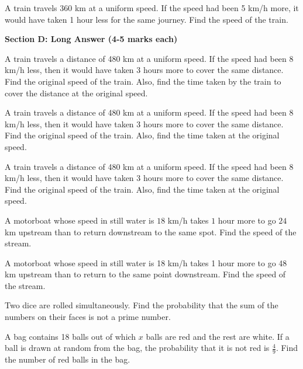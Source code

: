 \documentclass[12pt,a4paper]{exam}
\begin{document}
\begin{questions}
\question[3] A train travels 360 km at a uniform speed. If the speed had been 5 km/h more, it would have taken 1 hour less for the same journey. Find the speed of the train.
\vspace{0.15cm}

\end{questions}
\bigskip
\noindent\textbf{\large Section D: Long Answer (4-5 marks each)}

\begin{questions}
\question[5] A train travels a distance of 480 km at a uniform speed. If the speed had been 8 km/h less, then it would have taken 3 hours more to cover the same distance. Find the original speed of the train. Also, find the time taken by the train to cover the distance at the original speed.
\vspace{0.15cm}

\question[5] A train travels a distance of 480 km at a uniform speed. If the speed had been 8 km/h less, then it would have taken 3 hours more to cover the same distance. Find the original speed of the train. Also, find the time taken at the original speed.
\vspace{0.15cm}

\question[5] A train travels a distance of 480 km at a uniform speed. If the speed had been 8 km/h less, then it would have taken 3 hours more to cover the same distance. Find the original speed of the train. Also, find the time taken at the original speed.
\vspace{0.15cm}

\question[5] A motorboat whose speed in still water is $18$ km/h takes $1$ hour more to go $24$ km upstream than to return downstream to the same spot. Find the speed of the stream.
\vspace{0.15cm}

\question[5] A motorboat whose speed in still water is 18 km/h takes 1 hour more to go 48 km upstream than to return to the same point downstream. Find the speed of the stream.
\vspace{0.15cm}

\question[5] Two dice are rolled simultaneously. Find the probability that the sum of the numbers on their faces is not a prime number.
\vspace{0.15cm}

\question[5] A bag contains 18 balls out of which $x$ balls are red and the rest are white. If a ball is drawn at random from the bag, the probability that it is not red is $\frac{4}{9}$. Find the number of red balls in the bag.
\vspace{0.15cm}


\end{questions}
\end{document}

